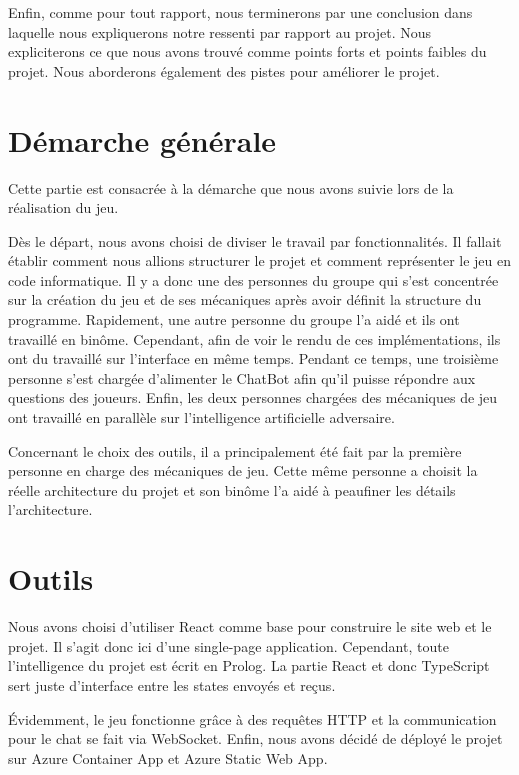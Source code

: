 \documentclass[a4paper, 11pt]{article}
\begin{document}
Enfin, comme pour tout rapport, nous terminerons par une conclusion dans laquelle nous expliquerons notre ressenti par rapport au projet. Nous expliciterons ce que nous avons trouvé comme points forts et points faibles du projet. Nous aborderons également des pistes pour améliorer le projet.

\newpage

\section{Démarche générale}

Cette partie est consacrée à la démarche que nous avons suivie lors de la réalisation du jeu.\newline

Dès le départ, nous avons choisi de diviser le travail par fonctionnalités. Il fallait établir comment nous allions structurer le projet et comment représenter le jeu en code informatique. Il y a donc une des personnes du groupe qui s'est concentrée sur la création du jeu et de ses mécaniques après avoir définit la structure du programme. Rapidement, une autre personne du groupe l'a aidé et ils ont travaillé en binôme. Cependant, afin de voir le rendu de ces implémentations, ils ont du travaillé sur l'interface en même temps. Pendant ce temps, une troisième personne s'est chargée d'alimenter le ChatBot afin qu'il puisse répondre aux questions des joueurs. Enfin, les deux personnes chargées des mécaniques de jeu ont travaillé en parallèle sur l'intelligence artificielle adversaire.\newline

Concernant le choix des outils, il a principalement été fait par la première personne en charge des mécaniques de jeu. Cette même personne a choisit la réelle architecture du projet et son binôme l'a aidé à peaufiner les détails l'architecture.

\section{Outils}

Nous avons choisi d'utiliser React comme base pour construire le site web et le projet. Il s'agit donc ici d'une single-page application. Cependant, toute l'intelligence du projet est écrit en Prolog. La partie React et donc TypeScript sert juste d'interface entre les states envoyés et reçus.\newline

Évidemment, le jeu fonctionne grâce à des requêtes HTTP et la communication pour le chat se fait via WebSocket. Enfin, nous avons décidé de déployé le projet sur Azure Container App et Azure Static Web App. 
\end{document}
